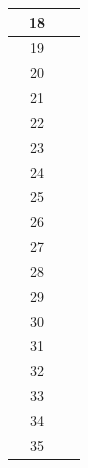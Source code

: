 \begin{procedure}
\begin{boxedtable}
{{\begin{tabular}{|c|c|c|c|}
          \hline
                          & 18         &                &           \\
          \hline
                          & 19         &                &           \\
          \hline
                          & 20         &                &           \\
          \hline
                          & 21         &                &           \\
          \hline
                          & 22         &                &           \\
          \hline
                          & 23         &                &           \\
          \hline
                          & 24         &                &           \\
          \hline
                          & 25         &                &           \\
          \hline
                          & 26         &                &           \\
          \hline
                          & 27         &                &           \\
          \hline
                          & 28         &                &           \\
          \hline
                          & 29         &                &           \\
          \hline
                          & 30         &                &           \\
          \hline
                          & 31         &                &           \\
          \hline
                          & 32         &                &           \\
          \hline
                          & 33         &                &           \\
          \hline
                          & 34         &                &           \\
          \hline
                          & 35         &                &           \\
          \hline
        \end{tabular}
      }%
    }
  \end{boxedtable}

\end{procedure}

